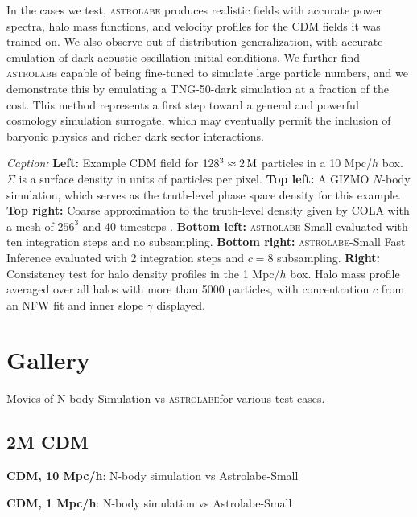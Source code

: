 \documentclass[11pt]{article}
\newcommand{\astrolabe}{\textsc{astrolabe}}
\newcommand{\figpair}[3]{%
  \begin{tcolorbox}[colback=blue!4,colframe=blue!40!black,
                    title={Figure pair: \texttt{#1} and \texttt{#2}}]
  \emph{Caption:} #3
  \end{tcolorbox}}
\newenvironment{gallery}{}{}
\newcommand{\movie}[3]{%
  \begin{tcolorbox}[colback=purple!4,colframe=purple!45!black,
                    title={Movie: \texttt{#1}}]
  \textbf{#2}: #3
  \end{tcolorbox}}
\begin{document}
In the cases we test, \astrolabe{} produces realistic fields with accurate power spectra, halo mass functions, and velocity profiles for the CDM fields it was trained on. We also observe out-of-distribution generalization, with accurate emulation of dark-acoustic oscillation initial conditions. We further find \astrolabe{} capable of being fine-tuned to simulate large particle numbers, and we demonstrate this by emulating a TNG-50-dark simulation at a fraction of the cost. This method represents a first step toward a general and powerful cosmology simulation surrogate, which may eventually permit the inclusion of baryonic physics and richer dark sector interactions.

\figpair{cdm-2m-10mpc-zoom-z0}{mass-profile-1mpc-z0}{\textbf{Left:} Example
CDM field for $128^3\approx2\,\rm M$ particles in a 10 Mpc/$h$ box. $\Sigma$ is
a surface density in units of particles per pixel. \textbf{Top left:} A
\textsc{GIZMO} \cite{Hopkins:2014qka} $N$-body simulation, which serves as the
truth-level phase space density for this example. \textbf{Top right:} Coarse
approximation to the truth-level density given by COLA with a mesh of $256^3$
and 40 timesteps \cite{Tassev:2013pn}. \textbf{Bottom left:} \astrolabe{}-Small
evaluated with ten integration steps and no subsampling. \textbf{Bottom right:}
\astrolabe{}-Small Fast Inference evaluated with 2 integration steps and $c=8$
subsampling. \textbf{Right:} Consistency test for halo density profiles in the
1 Mpc/$h$ box. Halo mass profile averaged over all halos with more than 5000
particles, with concentration $c$ from an NFW fit and inner slope $\gamma$
displayed.}

\section{Gallery}

Movies of N-body Simulation vs \astrolabe for various test cases.  

\subsection{2M CDM}

\begin{gallery}
\movie{2M-CDM/cinematic-2M-10Mpc-CDM-regen23-truth-vs-stage2}{CDM, 10 Mpc/h}{N-body simulation vs Astrolabe-Small}
\movie{2M-CDM/cinematic-2M-1Mpc-CDM-regen23-truth-vs-stage2}{CDM, 1 Mpc/h}{N-body simulation vs Astrolabe-Small}
\end{gallery}
\end{document}
